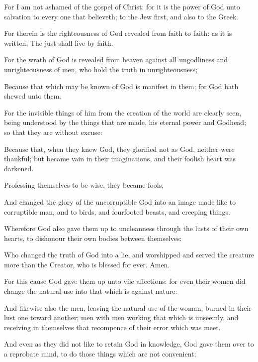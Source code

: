 {For I
am
not
ashamed of the
gospel of
Christ:
for it
is the
power of
God
unto
salvation to every
one
that
believeth; to the
Jew
first,
and
also to the
Greek.

For
therein
is the
righteousness of
God
revealed
from
faith
to
faith:
as it is
written, The
just shall
live
by
faith.


\par }{\PP {}For the
wrath of
God is
revealed
from
heaven
against
all
ungodliness
and
unrighteousness of
men,
who
hold the
truth
in
unrighteousness;

Because that which may be
known of
God
is
manifest
in
them;
for
God hath
shewed
{} unto
them.

For the invisible
things of
him
from the
creation of the
world are clearly
seen, being
understood by the things that are
made,
{}
his
eternal
power
and
Godhead; so
that
they
are without
excuse:

Because
that, when they
knew
God, they
glorified
{}
not
as
God,
neither were
thankful;
but became
vain
in
their
imaginations,
and
their
foolish
heart was
darkened.

Professing
themselves to
be
wise, they became
fools,

And
changed the
glory of the
uncorruptible
God
into an
image made like
to
corruptible
man,
and to
birds,
and fourfooted
beasts,
and creeping
things.


\par }{\PP {}Wherefore
God
also
gave
them
up
to
uncleanness
through the
lusts of their
own
hearts, to
dishonour their
own
bodies
between
themselves:

Who
changed the
truth of
God
into a
lie,
and
worshipped
and
served the
creature more
than the
Creator,
who
is
blessed
for
ever.
Amen.

For
this
cause
God
gave
them
up
unto
vile
affections:
for
even
their
women did
change the
natural
use
into that which
is
against
nature:

And
likewise
also the
men,
leaving the
natural
use of the
woman,
burned
in
their
lust
one
toward
another;
men
with
men
working that which is
unseemly,
and
receiving
in
themselves that
recompence of
their
error
which was
meet.

And even
as they
did
not
like to
retain
God
in
{}
knowledge,
God
gave
them
over
to a
reprobate
mind, to
do those
things which
are
not
convenient;

}
